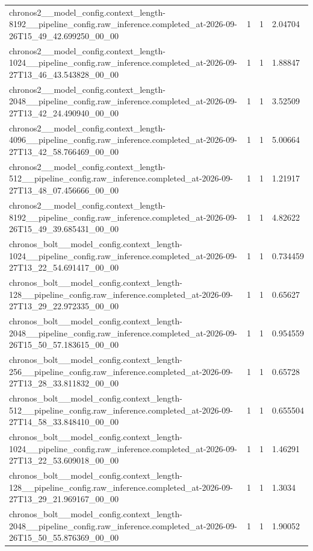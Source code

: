 \begin{tabular}{llll}
chronos2\_\_model\_config.context\_length-8192\_\_pipeline\_config.raw\_inference.completed\_at-2026-09-26T15\_49\_42.699250\_00\_00 & 1 & 1 & 2.04704 \\
chronos2\_\_model\_config.context\_length-1024\_\_pipeline\_config.raw\_inference.completed\_at-2026-09-27T13\_46\_43.543828\_00\_00 & 1 & 1 & 1.88847 \\
chronos2\_\_model\_config.context\_length-2048\_\_pipeline\_config.raw\_inference.completed\_at-2026-09-27T13\_42\_24.490940\_00\_00 & 1 & 1 & 3.52509 \\
chronos2\_\_model\_config.context\_length-4096\_\_pipeline\_config.raw\_inference.completed\_at-2026-09-27T13\_42\_58.766469\_00\_00 & 1 & 1 & 5.00664 \\
chronos2\_\_model\_config.context\_length-512\_\_pipeline\_config.raw\_inference.completed\_at-2026-09-27T13\_48\_07.456666\_00\_00 & 1 & 1 & 1.21917 \\
chronos2\_\_model\_config.context\_length-8192\_\_pipeline\_config.raw\_inference.completed\_at-2026-09-26T15\_49\_39.685431\_00\_00 & 1 & 1 & 4.82622 \\
chronos\_bolt\_\_model\_config.context\_length-1024\_\_pipeline\_config.raw\_inference.completed\_at-2026-09-27T13\_22\_54.691417\_00\_00 & 1 & 1 & 0.734459 \\
chronos\_bolt\_\_model\_config.context\_length-128\_\_pipeline\_config.raw\_inference.completed\_at-2026-09-27T13\_29\_22.972335\_00\_00 & 1 & 1 & 0.65627 \\
chronos\_bolt\_\_model\_config.context\_length-2048\_\_pipeline\_config.raw\_inference.completed\_at-2026-09-26T15\_50\_57.183615\_00\_00 & 1 & 1 & 0.954559 \\
chronos\_bolt\_\_model\_config.context\_length-256\_\_pipeline\_config.raw\_inference.completed\_at-2026-09-27T13\_28\_33.811832\_00\_00 & 1 & 1 & 0.65728 \\
chronos\_bolt\_\_model\_config.context\_length-512\_\_pipeline\_config.raw\_inference.completed\_at-2026-09-27T14\_58\_33.848410\_00\_00 & 1 & 1 & 0.655504 \\
chronos\_bolt\_\_model\_config.context\_length-1024\_\_pipeline\_config.raw\_inference.completed\_at-2026-09-27T13\_22\_53.609018\_00\_00 & 1 & 1 & 1.46291 \\
chronos\_bolt\_\_model\_config.context\_length-128\_\_pipeline\_config.raw\_inference.completed\_at-2026-09-27T13\_29\_21.969167\_00\_00 & 1 & 1 & 1.3034 \\
chronos\_bolt\_\_model\_config.context\_length-2048\_\_pipeline\_config.raw\_inference.completed\_at-2026-09-26T15\_50\_55.876369\_00\_00 & 1 & 1 & 1.90052 \\

\end{tabular}
